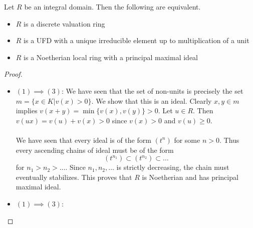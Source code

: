 \documentclass[a4paper]{article}
\begin{document}
\begin{prp}{}{} Let $R$ be an integral domain. Then the following are equivalent. 
\begin{itemize}
\item $R$ is a discrete valuation ring
\item $R$ is a UFD with a unique irreducible element up to multiplication of a unit
\item $R$ is a Noetherian local ring with a principal maximal ideal
\end{itemize} \tcbline
\begin{proof}~\\
\begin{itemize}
\item $(1)\implies(3)$: We have seen that the set of non-units is precisely the set $m=\{x\in K|v(x)>0\}$. We show that this is an ideal. Clearly $x,y\in m$ implies $v(x+y)=\min\{v(x),v(y)\}>0$. Let $u\in R$. Then $v(ux)=v(u)+v(x)>0$ since $v(x)>0$ and $v(u)\geq 0$. \\~\\
We have seen that every ideal is of the form $(t^n)$ for some $n>0$. Thus every ascending chains of ideal must be of the form $$(t^{n_1})\subset(t^{n_2})\subset\dots$$ for $n_1>n_2>\dots$. Since $n_1,n_2,\dots$ is strictly decreasing, the chain must eventually stabilizes. This proves that $R$ is Noetherian and has principal maximal ideal. 
\item $(1)\implies(3)$:
\end{itemize}
\end{proof}
\end{prp}
\end{document}
